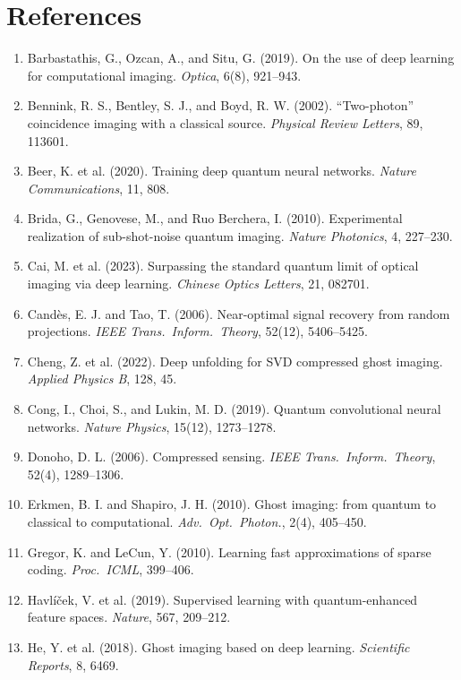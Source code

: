 \documentclass[12pt,a4paper]{article}
\begin{document}
\section*{References}
\small
\begin{enumerate}
    \item Barbastathis, G., Ozcan, A., and Situ, G. (2019). On the use of deep learning for computational imaging. \textit{Optica}, 6(8), 921--943.
    \item Bennink, R. S., Bentley, S. J., and Boyd, R. W. (2002). ``Two-photon'' coincidence imaging with a classical source. \textit{Physical Review Letters}, 89, 113601.
    \item Beer, K. et al. (2020). Training deep quantum neural networks. \textit{Nature Communications}, 11, 808.
    \item Brida, G., Genovese, M., and Ruo Berchera, I. (2010). Experimental realization of sub-shot-noise quantum imaging. \textit{Nature Photonics}, 4, 227--230.
    \item Cai, M. et al. (2023). Surpassing the standard quantum limit of optical imaging via deep learning. \textit{Chinese Optics Letters}, 21, 082701.
    \item Cand\`{e}s, E. J. and Tao, T. (2006). Near-optimal signal recovery from random projections. \textit{IEEE Trans.\ Inform.\ Theory}, 52(12), 5406--5425.
    \item Cheng, Z. et al. (2022). Deep unfolding for SVD compressed ghost imaging. \textit{Applied Physics B}, 128, 45.
    \item Cong, I., Choi, S., and Lukin, M. D. (2019). Quantum convolutional neural networks. \textit{Nature Physics}, 15(12), 1273--1278.
    \item Donoho, D. L. (2006). Compressed sensing. \textit{IEEE Trans.\ Inform.\ Theory}, 52(4), 1289--1306.
    \item Erkmen, B. I. and Shapiro, J. H. (2010). Ghost imaging: from quantum to classical to computational. \textit{Adv.\ Opt.\ Photon.}, 2(4), 405--450.
    \item Gregor, K. and LeCun, Y. (2010). Learning fast approximations of sparse coding. \textit{Proc.\ ICML}, 399--406.
    \item Havl\'{i}\v{c}ek, V. et al. (2019). Supervised learning with quantum-enhanced feature spaces. \textit{Nature}, 567, 209--212.
    \item He, Y. et al. (2018). Ghost imaging based on deep learning. \textit{Scientific Reports}, 8, 6469.

\end{enumerate}
\end{document}
